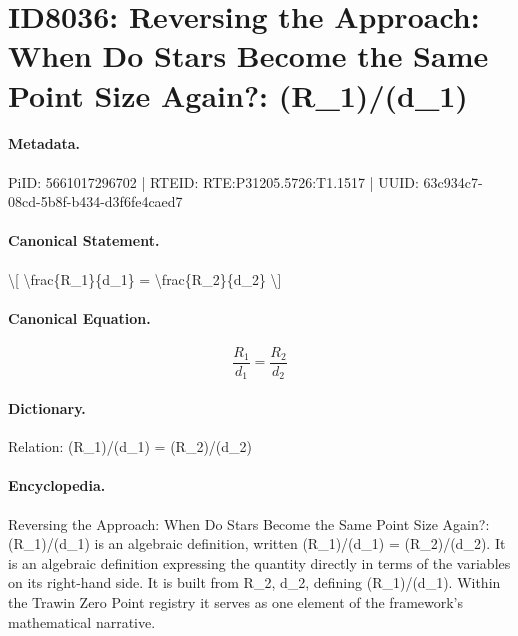 \section*{ID8036: Reversing the Approach: When Do Stars Become the Same Point Size Again?: (R\_1)/(d\_1)}
\paragraph{Metadata.}
PiID: 5661017296702 | RTEID: RTE:P31205.5726:T1.1517 | UUID: 63c934c7-08cd-5b8f-b434-d3f6fe4caed7

\paragraph{Canonical Statement.}
\textbackslash{}[ \textbackslash{}frac\{R\_1\}\{d\_1\} = \textbackslash{}frac\{R\_2\}\{d\_2\} \textbackslash{}]

\paragraph{Canonical Equation.}
\[
\frac{R_1}{d_1} = \frac{R_2}{d_2}
\]

\paragraph{Dictionary.}
Relation: (R\_1)/(d\_1) = (R\_2)/(d\_2)

\paragraph{Encyclopedia.}
Reversing the Approach: When Do Stars Become the Same Point Size Again?: (R\_1)/(d\_1) is an algebraic definition, written (R\_1)/(d\_1) = (R\_2)/(d\_2). It is an algebraic definition expressing the quantity directly in terms of the variables on its right-hand side. It is built from R\_2, d\_2, defining (R\_1)/(d\_1). Within the Trawin Zero Point registry it serves as one element of the framework's mathematical narrative.
